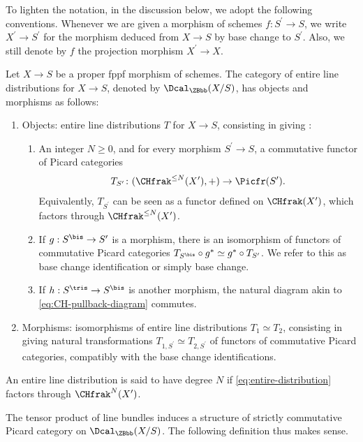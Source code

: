 To lighten the notation, in the discussion below, we adopt the following conventions. Whenever we are given a morphism of schemes $f\colon S^{\prime}\to S$, we write $X^{\prime}\to S^{\prime}$ for the morphism deduced from $X\to S$ by base change to $S^{\prime}$. Also, we still denote by $f$ the projection morphism $X^{\prime}\to X$.
\begin{definition}\label{def:distribution}
Let $X\to S$ be a proper fppf morphism of schemes. The category of entire line distributions for $X\to S$, denoted by $\Dcal_{\ZBbb}(X/S)$, has objects and morphisms as follows:
\begin{enumerate}
\item Objects: entire line distributions $T$ for $X\to S$, consisting in giving :
\begin{enumerate}
\item\label{item:distribution-1} An integer $N\geq 0$, and for every morphism $S^{\prime}\to S$, a commutative functor of Picard categories\vspace*{-3pt}
\begin{equation}\label{eq:entire-distribution}
T_{S^{\prime}}\colon (\CHfrak^{\leq N}(X^{\prime}), +) \to \Picfr(S^{\prime}).
\end{equation}
Equivalently, $T_{S^{\prime}}$ can be seen as a functor defined on $\CHfrak(X^{\prime})$, which factors through $\CHfrak^{\leq N}(X^{\prime})$.

\item\label{item:distribution-2} If $g: S^{\bis} \to S^{\prime}$ is a morphism, there is an isomorphism of functors of commutative Picard categories $T_{S^{\bis}}\circ g^\ast \simeq g^\ast \circ T_{S^\prime}$. We refer to this as base change identification or simply base change.
\item\label{item:distribution-3} If $h: S^{\tris} \to S^{\bis}$ is another morphism, the natural diagram akin to \eqref{eq:CH-pullback-diagram} commutes.
\end{enumerate}
\item Morphisms: isomorphisms of entire line distributions $T_{1}\simeq T_{2}$, consisting in giving natural transformations $T_{1, S^{\prime}}\simeq T_{2, S^{\prime}}$ of functors of commutative Picard categories, compatibly with the base change identifications.
\end{enumerate}
An entire line distribution is said to have degree $N$ if \eqref{eq:entire-distribution} factors through $\CHfrak^{N}(X^{\prime})$.
\end{definition}
The tensor product of line bundles induces a structure of strictly commutative Picard category on $\Dcal_{\ZBbb}(X/S)$. The following definition thus makes sense.

